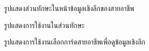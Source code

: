 \begin{figure}[H]\centering
    \caption{รูปแสดงส่วนทักษะในหน้าข้อมูลเชิงลึกของสายอาชีพ}\label{fig:skillinfo-CI}
\end{figure}
\begin{figure}[H]\centering
    \caption{รูปแสดงการใช้งานในส่วนทักษะ}\label{fig:skillaction-CI}
\end{figure}
\begin{figure}[H]\centering
    \caption{รูปแสดงการใช้งานเลือกการ์ดสายอาชีพเพื่อดูข้อมูลเชิงลึก}\label{fig:cardhistory-CI}
\end{figure}


